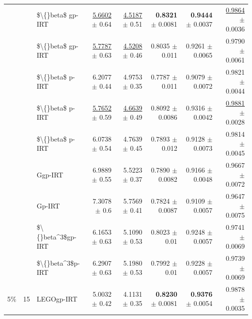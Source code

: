 \begin{longtable}{llp{}rrrrr}
 &  & \$\textbackslash\{\}beta\$ gp-IRT & \underline{5.6602} {\scriptsize $\pm$ 0.64} & \underline{4.5187} {\scriptsize $\pm$ 0.51} & \textbf{0.8321} {\scriptsize $\pm$ 0.0081} & \textbf{0.9444} {\scriptsize $\pm$ 0.0037} & \underline{0.9864} {\scriptsize $\pm$ 0.0036} \\
 &  & \$\textbackslash\{\}beta\$ gp-IRT & \underline{5.7787} {\scriptsize $\pm$ 0.63} & \underline{4.5208} {\scriptsize $\pm$ 0.46} & 0.8035 {\scriptsize $\pm$ 0.011} & 0.9261 {\scriptsize $\pm$ 0.0065} & 0.9790 {\scriptsize $\pm$ 0.0061} \\
 &  & \$\textbackslash\{\}beta\$ p-IRT & 6.2077 {\scriptsize $\pm$ 0.44} & 4.9753 {\scriptsize $\pm$ 0.35} & 0.7787 {\scriptsize $\pm$ 0.011} & 0.9079 {\scriptsize $\pm$ 0.0072} & 0.9821 {\scriptsize $\pm$ 0.0044} \\
 &  & \$\textbackslash\{\}beta\$ p-IRT & \underline{5.7652} {\scriptsize $\pm$ 0.59} & \underline{4.6639} {\scriptsize $\pm$ 0.49} & 0.8092 {\scriptsize $\pm$ 0.0086} & 0.9316 {\scriptsize $\pm$ 0.0042} & \underline{0.9881} {\scriptsize $\pm$ 0.0028} \\
 &  & \$\textbackslash\{\}beta\$ p-IRT & 6.0738 {\scriptsize $\pm$ 0.54} & 4.7639 {\scriptsize $\pm$ 0.45} & 0.7893 {\scriptsize $\pm$ 0.012} & 0.9128 {\scriptsize $\pm$ 0.0073} & 0.9814 {\scriptsize $\pm$ 0.0045} \\
 &  & Ggp-IRT & 6.9889 {\scriptsize $\pm$ 0.55} & 5.5223 {\scriptsize $\pm$ 0.37} & 0.7890 {\scriptsize $\pm$ 0.0082} & 0.9166 {\scriptsize $\pm$ 0.0048} & 0.9667 {\scriptsize $\pm$ 0.0072} \\
 &  & Gp-IRT & 7.3078 {\scriptsize $\pm$ 0.6} & 5.7569 {\scriptsize $\pm$ 0.41} & 0.7824 {\scriptsize $\pm$ 0.0087} & 0.9109 {\scriptsize $\pm$ 0.0057} & 0.9647 {\scriptsize $\pm$ 0.0075} \\
 &  & \$\textbackslash\{\}beta\textasciicircum{}3\$gp-IRT & 6.1653 {\scriptsize $\pm$ 0.63} & 5.1090 {\scriptsize $\pm$ 0.53} & 0.8023 {\scriptsize $\pm$ 0.01} & 0.9248 {\scriptsize $\pm$ 0.0057} & 0.9741 {\scriptsize $\pm$ 0.0069} \\
 &  & \$\textbackslash\{\}beta\textasciicircum{}3\$p-IRT & 6.2907 {\scriptsize $\pm$ 0.63} & 5.1980 {\scriptsize $\pm$ 0.53} & 0.7992 {\scriptsize $\pm$ 0.01} & 0.9228 {\scriptsize $\pm$ 0.0057} & 0.9739 {\scriptsize $\pm$ 0.0069} \\
\midrule
5\% & 15 & LEGOgp-IRT & 5.0032 {\scriptsize $\pm$ 0.42} & 4.1131 {\scriptsize $\pm$ 0.35} & \textbf{0.8230} {\scriptsize $\pm$ 0.0081} & \textbf{0.9376} {\scriptsize $\pm$ 0.0054} & 0.9878 {\scriptsize $\pm$ 0.0035} \\

\end{longtable}
